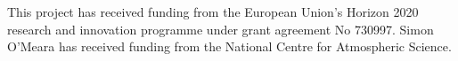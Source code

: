 \documentclass[gmd, manuscript]{copernicus}
\begin{document}


\begin{acknowledgements}
This project has received funding from the European Union's Horizon 2020 research and innovation programme under grant agreement No 730997.  Simon O'Meara has received funding from the National Centre for Atmospheric Science.
\end{acknowledgements}


















\end{document}
